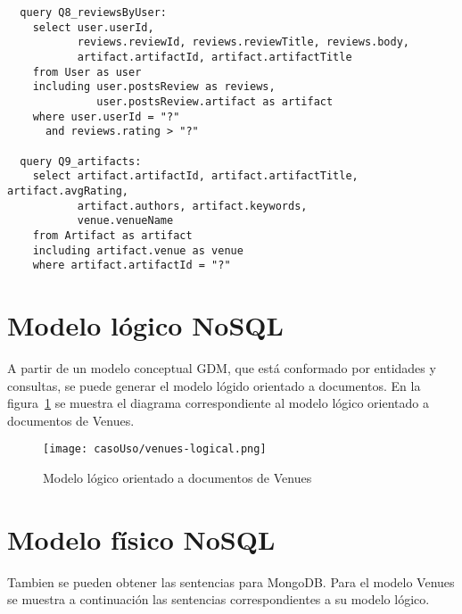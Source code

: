 \begin{verbatim}
  query Q8_reviewsByUser:
    select user.userId,
           reviews.reviewId, reviews.reviewTitle, reviews.body,
           artifact.artifactId, artifact.artifactTitle
    from User as user
    including user.postsReview as reviews,
              user.postsReview.artifact as artifact
    where user.userId = "?"
      and reviews.rating > "?"
  
  query Q9_artifacts:
    select artifact.artifactId, artifact.artifactTitle, artifact.avgRating,
           artifact.authors, artifact.keywords,
           venue.venueName
    from Artifact as artifact
    including artifact.venue as venue
    where artifact.artifactId = "?"
\end{verbatim}

\section{Modelo lógico NoSQL}

A partir de un modelo conceptual GDM, que está conformado por entidades y consultas, se puede generar el modelo lógido orientado a documentos. En la figura~\ref{img:venues-logical} se muestra el diagrama correspondiente al modelo lógico orientado a documentos de Venues.

\begin{figure}[H]
    \centering
    \texttt{[image: casoUso/venues-logical.png]}
    \caption{Modelo lógico orientado a documentos de Venues}
    \label{img:venues-logical}
\end{figure}

\section{Modelo físico NoSQL}

Tambien se pueden obtener las sentencias para MongoDB. Para el modelo Venues se muestra a continuación las sentencias correspondientes a su modelo lógico.

